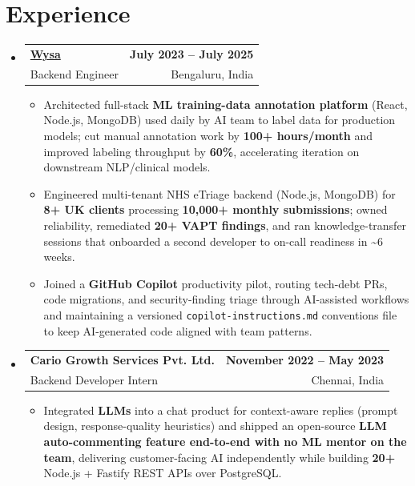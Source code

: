 \documentclass[letterpaper,10pt]{article}
\makeatletter
\newcommand{\resumeItem}[1]{
  \item\small{#1\vspace{-1pt}}
}
\newcommand{\resumeSubheading}[4]{
  \vspace{1pt}\item
    \begin{tabular*}{0.985\textwidth}[t]{l@{\extracolsep{\fill}}r}
      \textbf{#1} & \textbf{\small #2} \\
      {\small\color{ResumeSlate} #3} & {\small\color{ResumeSlate} #4} \\
    \end{tabular*}\vspace{-6pt}
}
\newcommand{\resumeSubHeadingListStart}{\begin{itemize}[leftmargin=0.0in, label={}, itemsep=2pt, topsep=2pt]}
\newcommand{\resumeSubHeadingListEnd}{\end{itemize}}
\newcommand{\resumeItemListStart}{\begin{itemize}[leftmargin=0.18in, itemsep=2pt, topsep=1pt]}
\newcommand{\resumeItemListEnd}{\end{itemize}\vspace{-4pt}}
\makeatother
\begin{document}
\section{Experience}
\resumeSubHeadingListStart
  \resumeSubheading
    {\href{https://www.wysa.io}{Wysa}}{July 2023 -- July 2025}
    {Backend Engineer}{Bengaluru, India}
    \resumeItemListStart
      \resumeItem{Architected full-stack \textbf{ML training-data annotation platform} (React, Node.js, MongoDB) used daily by AI team to label data for production models; cut manual annotation work by \textbf{100+ hours/month} and improved labeling throughput by \textbf{60\%}, accelerating iteration on downstream NLP/clinical models.}
      \resumeItem{Engineered multi-tenant NHS eTriage backend (Node.js, MongoDB) for \textbf{8+ UK clients} processing \textbf{10{,}000+ monthly submissions}; owned reliability, remediated \textbf{20+ VAPT findings}, and ran knowledge-transfer sessions that onboarded a second developer to on-call readiness in \textasciitilde6 weeks.}
      \resumeItem{Joined a \textbf{GitHub Copilot} productivity pilot, routing tech-debt PRs, code migrations, and security-finding triage through AI-assisted workflows and maintaining a versioned \texttt{copilot-instructions.md} conventions file to keep AI-generated code aligned with team patterns.}
    \resumeItemListEnd
  \resumeSubheading
    {Cario Growth Services Pvt. Ltd.}{November 2022 -- May 2023}
    {Backend Developer Intern}{Chennai, India}
    \resumeItemListStart
      \resumeItem{Integrated \textbf{LLMs} into a chat product for context-aware replies (prompt design, response-quality heuristics) and shipped an open-source \textbf{LLM auto-commenting feature end-to-end with no ML mentor on the team}, delivering customer-facing AI independently while building \textbf{20+} Node.js + Fastify REST APIs over PostgreSQL.}
    \resumeItemListEnd
\resumeSubHeadingListEnd
\vspace{-4pt}
\end{document}
